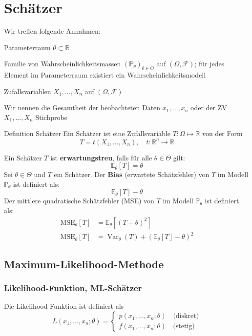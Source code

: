 \documentclass[a4paper,10pt]{article}
\def\R{\mathbb{R}}
\def\P{\mathbb{P}}
\def\F{\mathcal{F}}
\def\E{\mathbb{E}}
\DeclareMathOperator{\Var}{\text{Var}}
\begin{document}
\section{Schätzer}
Wir treffen folgende Annahmen:
\begin{rowlist}
	\item Parameterraum \(\theta \subset \R\)
	\item Familie von Wahrscheinlichkeitsmassen \((\P_\theta)_{\theta \in \Theta}\) auf \((\Omega, \F)\); für jedes Element im Parameterraum existiert ein Wahrscheinlichkeitsmodell
	\item Zufallsvariablen \(X_1, \ldots, X_n\) auf \((\Omega, \F)\)
	\item Wir nennen die Gesamtheit der beobachteten Daten \(x_1, \ldots, x_n\) oder der ZV \(X_1, \ldots, X_n\) Stichprobe
\end{rowlist}
\begin{mainbox}{Definition Schätzer}
	Ein Schätzer ist eine Zufallsvariable \(T: \Omega \mapsto \R\) von der Form
	\[T = t(X_1, \ldots, X_n), \quad t: \R^n \mapsto \R\]
\end{mainbox}
Ein Schätzer \(T\) ist \textbf{erwartungstreu}, falls für alle \(\theta \in \Theta\) gilt:
\[\E_\theta [T] = \theta\]
Sei \(\theta \in \Theta\) und \(T\) ein Schätzer. Der \textbf{Bias} (erwartete Schätzfehler) von \(T\) im Modell \(\P_\theta\) ist definiert als:
\[\E_\theta[T]-\theta\]
Der mittlere quadratische Schätzfehler (MSE) von \(T\) im Modell \(\P_\theta\) ist definiert als:
\begin{align*}
	\text{MSE}_\theta[T] & = \E_\theta[(T-\theta)^2]                    \\
	\text{MSE}_\theta[T] & = \Var_\theta(T) + (\E_\theta[T] - \theta)^2
\end{align*}

\subsection{Maximum-Likelihood-Methode}
\subsubsection{Likelihood-Funktion, ML-Schätzer}
Die Likelihood-Funktion ist definiert als
\[L(x_1, \ldots, x_n; \theta) = \begin{cases}
		p(x_1, \ldots, x_n; \theta) \quad \text{(diskret)} \\
		f(x_1, \ldots, x_n; \theta) \quad \text{(stetig)}
	\end{cases} \]
\end{document}
